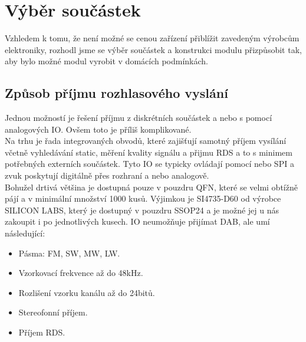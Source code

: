 \section{Výběr součástek}
\label{sec:Vyber}
Vzhledem k tomu, že není možné se cenou zařízení přiblížit zavedeným výrobcům elektroniky, rozhodl jsme se výběr součástek a konstrukci modulu přizpůsobit tak, aby bylo možné modul vyrobit v domácích podmínkách.

 
\subsection{Způsob příjmu rozhlasového vyslání}
Jednou možností je řešení příjmu z diskrétních součástek a nebo s pomocí analogových IO. Ovšem toto je příliš komplikované.\\
Na trhu je řada integrovaných obvodů, které zajišťují samotný příjem vysílání včetně vyhledávání static, měření kvality signálu a přijmu RDS a to s minimem potřebných externích součástek. Tyto IO se typicky ovládají pomocí \iic nebo SPI a zvuk poskytují digitálně přes rozhraní \iis a nebo analogově.\\
Bohužel drtivá většina je dostupná pouze v pouzdru QFN, které se velmi obtížně pájí a v minimální množství 1000 kusů. Výjimkou je SI4735-D60 od výrobce SILICON LABS, který je dostupný v pouzdru SSOP24 a je možné jej u nás zakoupit i po jednotlivých kusech. IO neumožňuje přijímat DAB, ale umí následující:
\begin{itemize}
\item{Pásma: FM, SW, MW, LW.}
\item{Vzorkovací frekvence až do 48kHz.}
\item{Rozlišení vzorku kanálu až do 24bitů.}
\item{Stereofonní příjem.}
\item{Příjem RDS.}
\end{itemize}

